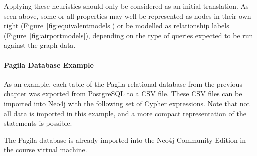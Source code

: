 Applying these heuristics should only be considered as an initial translation. As seen above, some or all properties may well be represented as nodes in their own right (Figure~\ref{fig:equivalentmodels}) or be modelled as relationship labels (Figure~\ref{fig:airportmodels}), depending on the type of queries expected to be run against the graph data.

\paragraph*{Pagila Database Example} As an example, each table of the Pagila relational database from the previous chapter was exported from PostgreSQL to a CSV file. These CSV files can be imported into Neo4j with the following set of Cypher expressions. Note that not all data is imported in this example, and a more compact representation of the statements is possible. 

\begin{tcolorbox}[colback=alert]
The Pagila database is already imported into the Neo4j Community Edition in the course virtual machine.
\end{tcolorbox}

\FloatBarrier

